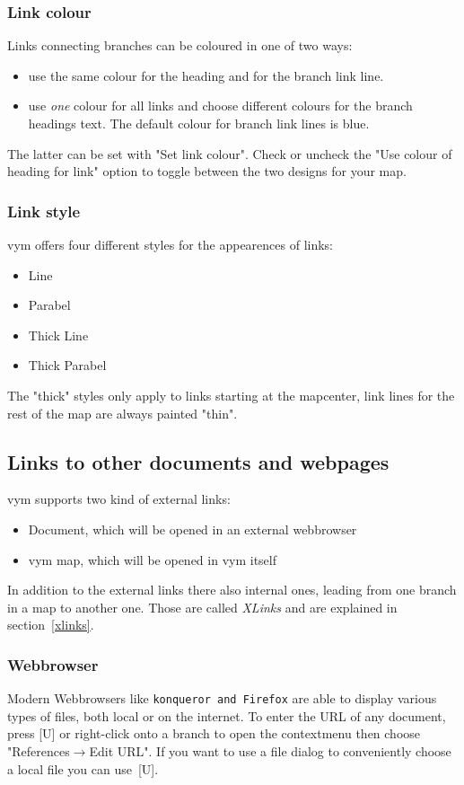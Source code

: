 \documentclass[12pt,a4paper]{article}
\newcommand{\vym}{{\sc vym }}
\newcommand{\ra}{$\longrightarrow$}
\newcommand{\key}[1]{[#1]}
\begin{document}
\subsubsection*{Link colour}
Links connecting branches can be coloured in one of two ways:
\begin{itemize}
	\item use the same colour for the heading and for the branch link line.
	\item use {\em one} colour for all links and choose different colours for the branch headings text. The default colour for branch link lines is blue.
\end{itemize}
The latter can be set with "Set link colour". Check or uncheck the "Use
colour of heading for link" option to toggle between the two designs for
your map.

\subsubsection*{Link style}
\vym offers four different styles for the appearences of links:
\begin{itemize}
	\item Line
	\item Parabel
	\item Thick Line
	\item Thick Parabel
\end{itemize}
The "thick" styles only apply to links starting at the mapcenter, link lines for the rest
of the map are always painted "thin".


\subsection{Links to other documents and webpages}
\vym supports two kind of external links:
\begin{itemize}
	\item Document, which will be opened in an external webbrowser
	\item \vym map, which will be opened in \vym itself
\end{itemize}
In addition to the external links there also internal ones, leading from one
branch in a map to another one. Those are called {\em XLinks} and are explained
in section~\ref{xlinks}.

\subsubsection*{Webbrowser}
Modern Webbrowsers like {\tt konqueror and Firefox} are able to display various
types of files, both local or on the internet. To enter the URL of
any document, press \key{U} or right-click  onto a branch to open the contextmenu then choose
"References\ra Edit URL". If you want to use a file dialog to
conveniently choose a local file you can use~\key{U}.
\end{document}
